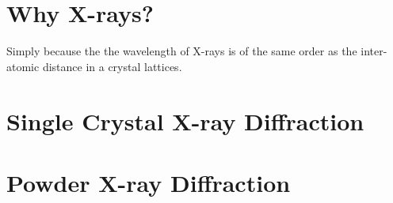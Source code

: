 \documentclass[11pt,a4paper]{article}
\begin{document}
	\section{Why X-rays?}
	
	Simply because the the wavelength of X-rays is of the same order as the inter-atomic distance in a crystal lattices.
		
	
	
	
	
	
	
	
	
	
	
	\section{Single Crystal X-ray Diffraction}
	
		
		
		
	
		
		
		
		
		
		
		
	
	\section{Powder X-ray Diffraction}
	
		
		
	
	
	\medskip
	
	\printbibliography
		
\end{document}
